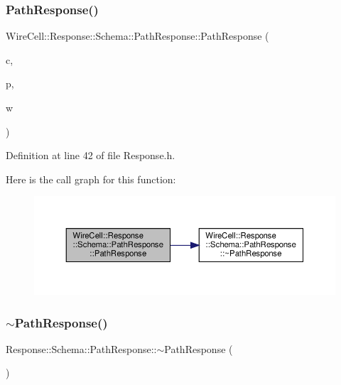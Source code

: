 \subsubsection{\texorpdfstring{Path\+Response()}{PathResponse()}\hspace{0.1cm}{\footnotesize\ttfamily [2/2]}}
{\footnotesize\ttfamily Wire\+Cell\+::\+Response\+::\+Schema\+::\+Path\+Response\+::\+Path\+Response (\begin{DoxyParamCaption}\item[{const \hyperlink{namespace_wire_cell_1_1_waveform_a479175e541c8545e87cd8063b74b6956}{Wire\+Cell\+::\+Waveform\+::realseq\+\_\+t} \&}]{c,  }\item[{double}]{p,  }\item[{double}]{w }\end{DoxyParamCaption})\hspace{0.3cm}{\ttfamily [inline]}}



Definition at line 42 of file Response.\+h.

Here is the call graph for this function\+:
\nopagebreak
\begin{figure}[H]
\begin{center}
\leavevmode
\includegraphics[width=350pt]{struct_wire_cell_1_1_response_1_1_schema_1_1_path_response_a1bca5ef0a4aded0b12f1dba65fe9d554_cgraph}
\end{center}
\end{figure}
\mbox{\label{struct_wire_cell_1_1_response_1_1_schema_1_1_path_response_a0e6677f86c80943d1c70a8a9ad1af4e1}} 
\subsubsection{\texorpdfstring{$\sim$\+Path\+Response()}{~PathResponse()}}
{\footnotesize\ttfamily Response\+::\+Schema\+::\+Path\+Response\+::$\sim$\+Path\+Response (\begin{DoxyParamCaption}{ }\end{DoxyParamCaption})}



